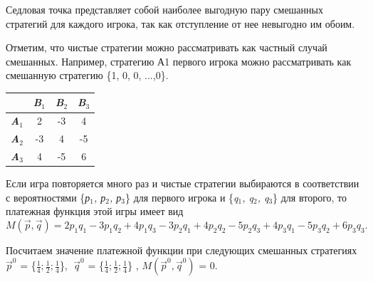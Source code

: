 Седловая точка представляет собой наиболее выгодную пару смешанных стратегий для каждого игрока, так как отступление от нее невыгодно им обоим.

Отметим, что чистые стратегии можно рассматривать как частный случай смешанных. Например, стратегию А1 первого игрока можно рассматривать как смешанную стратегию \{1, 0, 0, ...,0\}.

\renewcommand{\arraystretch}{1.5}
\renewcommand{\tabcolsep}{0.2cm}
\begin{table}[h!]
\label{table_4_4}
\begin{center}
\begin{tabular}{c|c|c|c}
     &  \textbf{\emph{B$_{1}$}} &  \textbf{\emph{B$_{2}$}} & \textbf{\emph{B$_{3}$}}  \\ \hline
   \multicolumn{1}{c|}{\textbf{\emph{A$_{1}$}}} & 2 & -3 & 4  \\ \hline
   \multicolumn{1}{c|}{\textbf{\emph{A$_{2}$}}} & -3 & 4 & -5  \\ \hline
   \multicolumn{1}{c|}{\textbf{\emph{A$_{3}$}}} & 4 & -5 & 6 \\
\end{tabular}
\end{center}
\end{table}

Если игра повторяется много раз и чистые стратегии выбираются в  соответствии с вероятностями  \{\emph{р$_{1}$, р$_{2}$, р$_{3}$}\} для первого игрока и  \{\emph{q$_{1}$, q$_{2}$, q$_{3}$}\} для второго, то платежная функция этой игры имеет вид
\begin{equation}
\label{equation_4_7}
M(\vec{p}, \vec{q}) = 2p_{1}q_{1} - 3p_{1}q_{2} + 4p_{1}q_{3} - 3p_{2}q_{1} + 4p_{2}q_{2} - 5p_{2}q_{3} + 4p_{3}q_{1} - 5p_{3}q_{2} + 6p_{3}q_{3}.
\end{equation}

Посчитаем значение платежной функции при следующих смешанных стратегиях $\vec{p}^0$ = \Large \{$\frac{1}{4}; \frac{1}{2}; \frac{1}{4}$\}, \normalsize $\; \vec{q}^0$ = \Large \{$\frac{1}{4}; \frac{1}{2}; \frac{1}{4}$\} \normalsize, $M(\vec{p}^0, \vec{q}^0)$ = 0.

